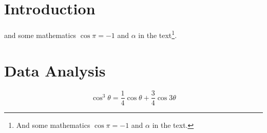 \documentclass[fleqn,10pt]{SelfArx} %
\affiliation{\textsuperscript{1}\textit{}} %
\affiliation{\textsuperscript{2}\textit{}} %
\begin{document}
	\boldmath

\flushbottom %

\maketitle %

\tableofcontents %

\thispagestyle{empty} %

\section{Introduction} %


\lipsum[1-3] %
 and some mathematics $\cos\pi=-1$ and $\alpha$ in the text\footnote{And some mathematics $\cos\pi=-1$ and $\alpha$ in the text.}.


\section{Data Analysis}


\lipsum[4] %

\begin{equation}
\cos^3 \theta =\frac{1}{4}\cos\theta+\frac{3}{4}\cos 3\theta
\label{eq:refname2}
\end{equation}

\lipsum[5] %
\end{document}
